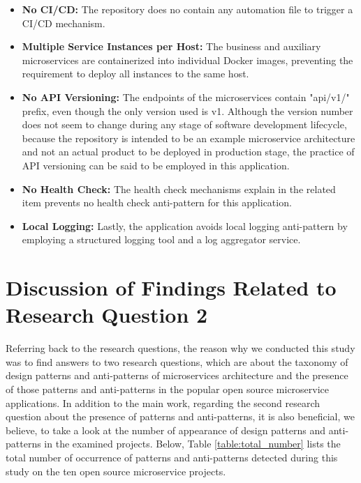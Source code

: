\documentclass{Configuration_Files/PoliMi3i_thesis}
\begin{document}
\begin{itemize}
    \item \textbf{No CI/CD:} The repository does no contain any automation file to trigger a CI/CD mechanism.
    
    \item \textbf{Multiple Service Instances per Host:} The business and auxiliary microservices are containerized into individual Docker images, preventing the requirement to deploy all instances to the same host.
    
    \item \textbf{No API Versioning:} The endpoints of the microservices contain "api/v1/" prefix, even though the only version used is v1.
    Although the version number does not seem to change during any stage of software development lifecycle, because the repository is intended to be an example microservice architecture and not an actual product to be deployed in production stage, the practice of API versioning can be said to be employed in this application.
    
    \item \textbf{No Health Check:} The health check mechanisms explain in the related item prevents no health check anti-pattern for this application.
    
    \item \textbf{Local Logging:} Lastly, the application avoids local logging anti-pattern by employing a structured logging tool and a log aggregator service.
\end{itemize}

\chapter{Discussion of Findings Related to Research Question 2}
\label{ch:discussion}%

Referring back to the research questions, the reason why we conducted this study was to find answers to two research questions, which are about the taxonomy of design patterns and anti-patterns of microservices architecture and the presence of those patterns and anti-patterns in the popular open source microservice applications. 
In addition to the main work, regarding the second research question about the presence of patterns and anti-patterns, it is also beneficial, we believe, to take a look at the number of appearance of design patterns and anti-patterns in the examined projects.
Below, Table \ref{table:total_number} lists the total number of occurrence of patterns and anti-patterns detected during this study on the ten open source microservice projects.
\end{document}
